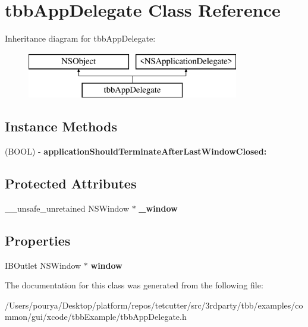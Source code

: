 \hypertarget{interfacetbbAppDelegate}{}\section{tbb\+App\+Delegate Class Reference}
\label{interfacetbbAppDelegate}
Inheritance diagram for tbb\+App\+Delegate\+:\begin{figure}[H]
\begin{center}
\leavevmode
\includegraphics[height=2.000000cm]{interfacetbbAppDelegate}
\end{center}
\end{figure}
\subsection*{Instance Methods}
\begin{DoxyCompactItemize}
\item 
\hypertarget{interfacetbbAppDelegate_a062ce5cac95ae4a79ccdf6183e375d0d}{}(B\+O\+O\+L) -\/ {\bfseries application\+Should\+Terminate\+After\+Last\+Window\+Closed\+:}\label{interfacetbbAppDelegate_a062ce5cac95ae4a79ccdf6183e375d0d}

\end{DoxyCompactItemize}
\subsection*{Protected Attributes}
\begin{DoxyCompactItemize}
\item 
\hypertarget{interfacetbbAppDelegate_a7e27fed94a294cc8eedee05db6178690}{}\+\_\+\+\_\+unsafe\+\_\+unretained N\+S\+Window $\ast$ {\bfseries \+\_\+window}\label{interfacetbbAppDelegate_a7e27fed94a294cc8eedee05db6178690}

\end{DoxyCompactItemize}
\subsection*{Properties}
\begin{DoxyCompactItemize}
\item 
\hypertarget{interfacetbbAppDelegate_af1d9b7777fcf3f0a07b6eb5145b6a3f0}{}I\+B\+Outlet N\+S\+Window $\ast$ {\bfseries window}\label{interfacetbbAppDelegate_af1d9b7777fcf3f0a07b6eb5145b6a3f0}

\end{DoxyCompactItemize}


The documentation for this class was generated from the following file\+:\begin{DoxyCompactItemize}
\item 
/\+Users/pourya/\+Desktop/platform/repos/tetcutter/src/3rdparty/tbb/examples/common/gui/xcode/tbb\+Example/tbb\+App\+Delegate.\+h\end{DoxyCompactItemize}
